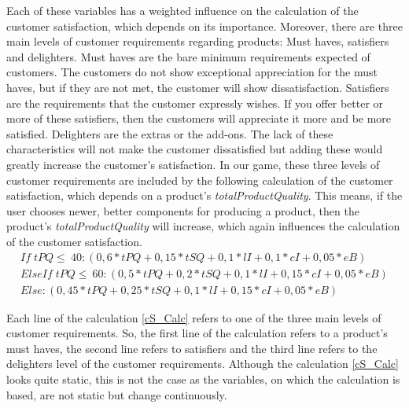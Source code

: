Each of these variables has a weighted influence on the calculation of the customer satisfaction, which depends on its importance.
Moreover, there are three main levels of customer requirements regarding products: Must haves, satisfiers and delighters. \cite{krienke_messung_2009}
Must haves are the bare minimum requirements expected of customers. The customers do not show exceptional appreciation for the must haves, but if they are not met, the customer will show dissatisfaction. Satisfiers are the requirements that the customer expressly wishes. If you offer better or more of these satisfiers, then the customers will appreciate it more and be more satisfied. Delighters are the extras or the add-ons. The lack of these characteristics will not make the customer dissatisfied but adding these would greatly increase the customer's satisfaction. In our game, these three levels of customer requirements are included by the following calculation of the customer satisfaction, which depends on a product's \textit{totalProductQuality}. This means, if the user chooses newer, better components for producing a product, then the product's \textit{totalProductQuality} will increase, which again influences the calculation of the customer satisfaction.
    \begin{equation}
    \label{cS_Calc}
    \begin{aligned}
    If \; tPQ \leq \ 40: (0,6*tPQ + 0,15*tSQ + 0,1*lI + 0,1*cI + 0,05*eB)\\
    ElseIf \; tPQ \leq \ 60: (0,5*tPQ + 0,2*tSQ + 0,1*lI + 0,15*cI + 0,05*eB)\\
    Else: (0,45*tPQ + 0,25*tSQ + 0,1*lI + 0,15*cI + 0,05*eB)
    \end{aligned}
    \end{equation}

Each line of the calculation \ref{cS_Calc} refers to one of the three main levels of customer requirements. So, the first line of the calculation refers to a product's must haves, the second line refers to satisfiers and the third line refers to the delighters level of the customer requirements.
Although the calculation \ref{cS_Calc} looks quite static, this is not the case as the variables, on which the calculation is based, are not static but change continuously.
    
